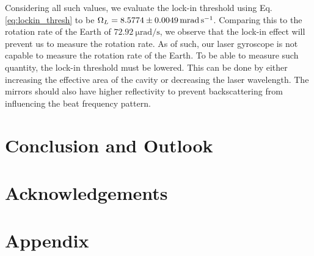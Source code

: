 \documentclass[a4paper]{report}
\numberwithin{equation}{section}
\begin{document}
Considering all such values, we evaluate the lock-in threshold using Eq. \ref{eq:lockin_thresh} to be $\Omega_L = \SI{8.5774 +- 0.0049}{\milli\radian\per\second}$. 
Comparing this to the rotation rate of the Earth of $\SI{72.92}{\micro\radian\per\second}$, we observe that the lock-in effect will 
prevent us to measure the rotation rate. As of such, our laser gyroscope is not capable to measure the rotation rate of the Earth. To be 
able to measure such quantity, the lock-in threshold must be lowered. This can be done by either increasing the effective area of 
the cavity or decreasing the laser wavelength. The mirrors should also have higher reflectivity to prevent backscattering 
from influencing the beat frequency pattern.\par 


\chapter{Conclusion and Outlook}

\chapter{Acknowledgements}

\printbibliography

\chapter{Appendix} \label{chap:appendix}

\printbibliography
\end{document}
